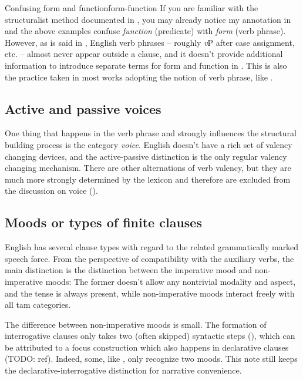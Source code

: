 \documentclass[UTF8, a4paper, oneside, scheme=plain]{ctexrep}
\newcommand*{\citepage}[1]{pp.~{#1}}
\newcommand{\vP}{\textit{v}P}
\begin{document}
\begin{infobox}{Confusing form and function}{form-function}
    If you are familiar with the structuralist method documented in \citet{cgel},
    you may already notice my annotation in 
    and the above examples confuse \emph{function} (predicate)
    with \emph{form} (verb phrase).
    However, as is said in ,
    English verb phrases -- roughly \vP{} after case assignment, etc. -- 
    almost never appear outside a clause,
    and it doesn't provide additional information 
    to introduce separate terms for form and function in .
    This is also the practice taken in most works adopting the notion of verb phrase,
    like \citet{Friesen2017}.
\end{infobox}

\subsection{Active and passive voices}

One thing that happens in the verb phrase 
and strongly influences the structural building process is the category \emph{voice}.
English doesn't have a rich set of valency changing devices,
and the active-passive distinction is the only regular valency changing mechanism.
There are other alternations of verb valency, 
but they are much more strongly determined by the lexicon 
and therefore are excluded from the discussion on voice ().

\subsection{Moods or types of finite clauses}\label{sec:moods}

English has several clause types with regard to the related grammatically marked speech force.
From the perspective of compatibility with the auxiliary verbs,
the main distinction is the distinction between the imperative mood and non-imperative moods:
The former doesn't allow any nontrivial modality and aspect,
and the tense is always present,
while non-imperative moods interact freely with all \acs{tam} categories.

The difference between non-imperative moods is small.
The formation of interrogative clauses 
only takes two (often skipped) syntactic steps 
(),
which can be attributed to a focus construction which also happens in declarative clauses (TODO: ref).
Indeed, some, like \citet[\citepage{25}]{dixon2005semantic}, only recognize two moods.
This note still keeps the declarative-interrogative distinction 
for narrative convenience.
\end{document}
